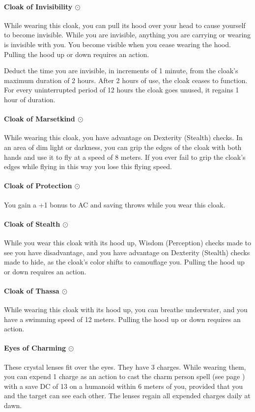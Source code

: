     \paragraph{Cloak of Invisibility $\odot$}
        While wearing this cloak, you can pull its hood over your head to cause yourself to become invisible.
        While you are invisible, anything you are carrying or wearing is invisible with you.
        You become visible when you cease wearing the hood.
        Pulling the hood up or down requires an action.

        Deduct the time you are invisible, in increments of 1 minute, from the cloak's maximum duration of 2 hours.
        After 2 hours of use, the cloak ceases to function.
        For every uninterrupted period of 12 hours the cloak goes unused, it regains 1 hour of duration.
    \paragraph{Cloak of Marsetkind $\odot$}
        While wearing this cloak, you have advantage on Dexterity (Stealth) checks.
        In an area of dim light or darkness, you can grip the edges of the cloak with both hands and use it to fly at a speed of 8 meters.
        If you ever fail to grip the cloak's edges while flying in this way you lose this flying speed.
    \paragraph{Cloak of Protection $\odot$}
        You gain a +1 bonus to AC and saving throws while you wear this cloak.
    \paragraph{Cloak of Stealth $\odot$}
        While you wear this cloak with its hood up, Wisdom (Perception) checks made to see you have disadvantage, and you have advantage on Dexterity (Stealth) checks made to hide, as the cloak's color shifts to camouflage you.
        Pulling the hood up or down requires an action.
    \paragraph{Cloak of Thassa $\odot$}
        While wearing this cloak with its hood up, you can breathe underwater, and you have a swimming speed of 12 meters.
        Pulling the hood up or down requires an action.
    \paragraph{Eyes of Charming $\odot$}
        These crystal lenses fit over the eyes.
        They have 3 charges.
        While wearing them, you can expend 1 charge as an action to cast the charm person spell (see page \pageref{spell::charmperson}) with a save DC of 13 on a humanoid within 6 meters of you, provided that you and the target can see each other.
        The lenses regain all expended charges daily at dawn.
